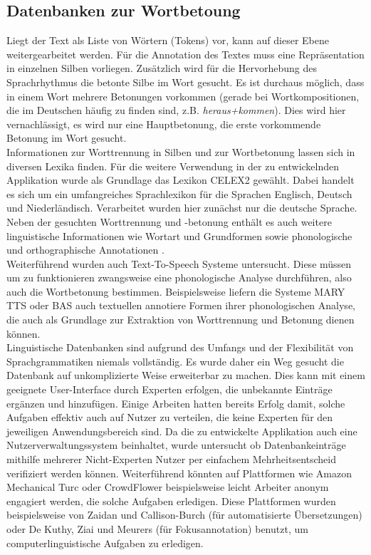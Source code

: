\subsection{Datenbanken zur Wortbetoung}
Liegt der Text als Liste von Wörtern (Tokens) vor, kann auf dieser Ebene weitergearbeitet werden. Für die Annotation des Textes muss eine Repräsentation in einzelnen Silben vorliegen. Zusätzlich wird für die Hervorhebung des Sprachrhythmus die betonte Silbe im Wort gesucht. Es ist durchaus möglich, dass in einem Wort mehrere Betonungen vorkommen (gerade bei Wortkompositionen, die im Deutschen häufig zu finden sind, z.B. \textit{heraus+kommen}). Dies wird hier vernachlässigt, es wird nur eine Hauptbetonung, die erste vorkommende Betonung im Wort gesucht.\\
Informationen zur Worttrennung in Silben und zur Wortbetonung lassen sich in diversen Lexika finden.  Für die weitere Verwendung in der zu entwickelnden Applikation wurde als Grundlage das Lexikon CELEX2 gewählt. Dabei handelt es sich um ein umfangreiches Sprachlexikon für die Sprachen Englisch, Deutsch und Niederländisch. Verarbeitet wurden hier zunächst nur die deutsche Sprache. Neben der gesuchten Worttrennung und -betonung enthält es auch weitere linguistische Informationen wie Wortart und Grundformen sowie phonologische und orthographische Annotationen  .
\\
Weiterführend wurden auch Text-To-Speech Systeme  untersucht. Diese müssen um zu funktionieren zwangsweise eine phonologische Analyse durchführen, also auch die Wortbetonung bestimmen. Beispielsweise liefern die Systeme MARY TTS oder BAS auch textuellen annotiere Formen ihrer phonologischen Analyse, die auch als Grundlage zur Extraktion von Worttrennung und Betonung dienen können.\\

Linguistische Datenbanken sind aufgrund des Umfangs und der Flexibilität von Sprachgrammatiken niemals vollständig. Es wurde daher ein Weg gesucht die Datenbank auf unkomplizierte Weise erweiterbar zu machen. Dies kann mit einem geeignete User-Interface durch Experten erfolgen, die unbekannte Einträge ergänzen und hinzufügen. Einige Arbeiten hatten bereits Erfolg damit, solche Aufgaben effektiv auch auf Nutzer zu verteilen, die keine Experten für den jeweiligen Anwendungsbereich sind. Da die zu entwickelte Applikation auch eine Nutzerverwaltungssystem beinhaltet, wurde untersucht ob Datenbankeinträge mithilfe mehrerer Nicht-Experten Nutzer per einfachem Mehrheitsentscheid verifiziert werden können. Weiterführend könnten auf Plattformen wie Amazon Mechanical Turc oder CrowdFlower beispielsweise leicht Arbeiter anonym engagiert werden, die solche Aufgaben erledigen\cite{Snow2008}. Diese Plattformen wurden beispielsweise von Zaidan und Callison-Burch (für automatisierte Übersetzungen)\cite{Zaidan2011} oder De Kuthy, Ziai und Meurers\cite{Meurers2015} (für Fokusannotation) benutzt, um computerlinguistische Aufgaben zu erledigen.